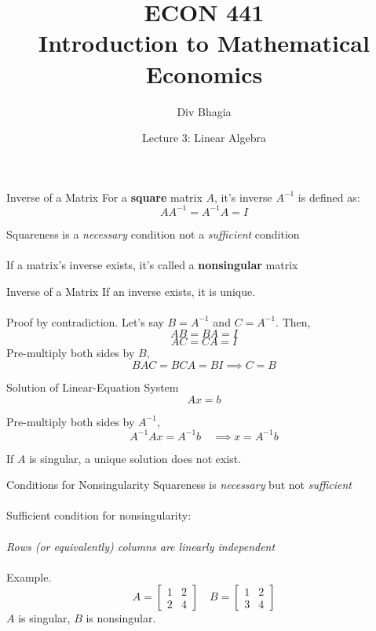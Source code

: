 \documentclass{./../../Latex/teaching_slides}
\begin{document}
\title{ECON 441 \\ \vspace{0.4em} \normalsize Introduction to Mathematical Economics}
\author{Div Bhagia}
\date{Lecture 3: Linear Algebra}

\begin{frame}
\maketitle
\end{frame}


\begin{frame}{Inverse of a Matrix}
For a \textbf{square} matrix $A$, it's inverse $A^{-1}$ is defined as:
$$
A A^{-1}=A^{-1} A=I
$$

\vspace{2em}
 Squareness is a \textit{necessary} condition not a \textit{sufficient} condition \\~\\
 If a matrix's inverse exists, it's called a \textbf{nonsingular} matrix
\end{frame}

\begin{frame}{Inverse of a Matrix}
If an inverse exists, it is unique. \\~\\
Proof by contradiction. Let's say $B = A^{-1}$ and $C=A^{-1}$.
Then, $$ AB=BA=I $$
 $$ AC=CA=I $$
Pre-multiply both sides by $B$,
$$ BAC=BCA=BI  \implies C=B $$
\end{frame}

\begin{frame}{Solution of Linear-Equation System}
$$ Ax = b $$

\vspace{1em}
Pre-multiply both sides by $A^{-1}$, 
$$ A^{-1} Ax = A^{-1} b \quad \implies x = A^{-1} b $$

If $A$ is singular, a unique solution does not exist. 
\end{frame}

\begin{frame}{Conditions for Nonsingularity}
Squareness is \textit{necessary} but not  \textit{sufficient} \\~\\
Sufficient condition for nonsingularity: \\~\\
\hspace{1em} \textit{Rows (or equivalently) columns are linearly independent} \\~\\
Example. $$
A=\left[\begin{array}{ll}
1 & 2 \\
2 & 4
\end{array}\right]
\quad
B=\left[\begin{array}{ll}
1 & 2 \\
3 & 4
\end{array}\right]
$$
\pause $A$ is singular, $B$ is nonsingular.
\end{frame}
\end{document}
